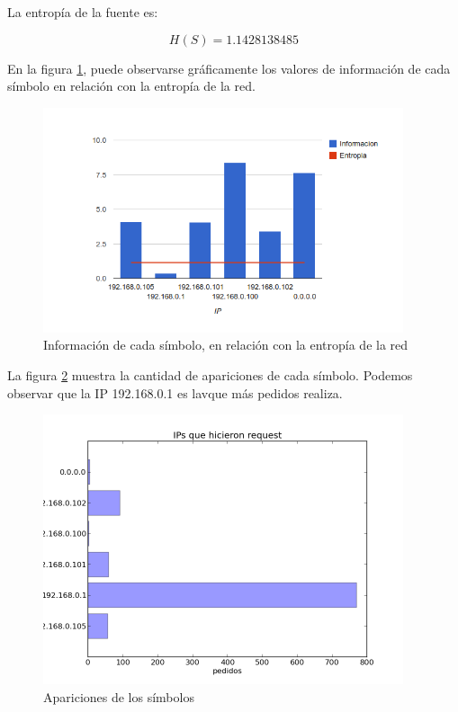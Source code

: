 \documentclass{article}
\begin{document}
\vskip10pt

La entropía de la fuente es:

$$H(S) = 1.1428138485$$

En la figura \ref{fig:red2requesters:infoentro}, puede observarse gráficamente
los valores de información de cada símbolo en relación con la entropía de la
red.

\begin{figure}[h!]
    \centering                                                       
    \includegraphics[width=300pt]{red2/consultas2.png}
    \caption{Información de cada símbolo, en relación con la
        entropía de la red}
    \label{fig:red2requesters:infoentro}
\end{figure}

La figura \ref{fig:red2requesters:count} muestra la cantidad de apariciones de
cada símbolo. Podemos observar que la IP 192.168.0.1 es lavque más pedidos realiza.

\begin{figure}[h!]
    \centering                                                       
    \includegraphics[width=300pt]{red2/red2requesters.png}
    \caption{Apariciones de los símbolos}
    \label{fig:red2requesters:count}
\end{figure}
\end{document}
